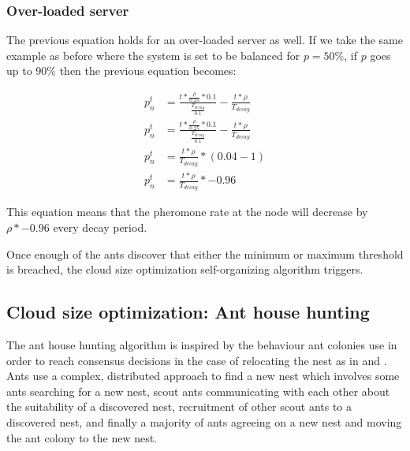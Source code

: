 \documentclass[conference]{IEEEtran}
\begin{document}
\subsubsection{Over-loaded server}

The previous equation holds for an over-loaded server as well. If we take the same example as before where the system is set to be balanced for $p = 50\%$, if $p$ goes up to $90\%$ then the previous equation becomes:

\begin{equation}
\begin{aligned}
p^{t}_{n} &= \frac{t *  \frac{\rho}{0.25} * 0.1}{\frac{T_{decay}}{0.1}} - \frac{t *  \rho}{T_{decay}} \\
p^{t}_{n} &= \frac{t *  \frac{\rho}{0.25} * 0.1}{\frac{T_{decay}}{0.1}} - \frac{t *  \rho}{T_{decay}} \\
p^{t}_{n} &= \frac{t * \rho}{T_{decay}} * (0.04 - 1) \\
p^{t}_{n} &= \frac{t * \rho}{T_{decay}} * -0.96
\end{aligned}
\end{equation}

This equation means that the pheromone rate at the node will decrease by $\rho * -0.96$ every decay period.

Once enough of the ants discover that either the minimum or maximum threshold is breached, the cloud size optimization self-organizing algorithm triggers.

\subsection{Cloud size optimization: Ant house hunting}

The ant house hunting algorithm is inspired by the behaviour ant colonies use in order to reach consensus decisions in the case of relocating the nest as in \cite{selforg:antreloc} and \cite{selforg:antreloc2}. Ants use a complex, distributed approach to find a new nest which involves some ants searching for a new nest, scout ants communicating with each other about the suitability of a discovered nest, recruitment of other scout ants to a discovered nest, and finally a majority of ants agreeing on a new nest and moving the ant colony to the new nest.
\end{document}
